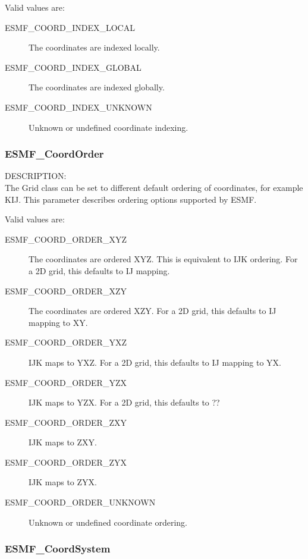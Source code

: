 Valid values are:
\begin{description}
   \item [ESMF\_COORD\_INDEX\_LOCAL]
         The coordinates are indexed locally.  

   \item [ESMF\_COORD\_INDEX\_GLOBAL]
         The coordinates are indexed globally.

   \item [ESMF\_COORD\_INDEX\_UNKNOWN]
         Unknown or undefined coordinate indexing.
\end{description}

\subsubsection{ESMF\_CoordOrder}

{\sf DESCRIPTION:\\}
The Grid class can be set to different default ordering of coordinates, for
example KIJ.  This parameter describes ordering options supported by ESMF.

Valid values are:
\begin{description}
   \item [ESMF\_COORD\_ORDER\_XYZ]
         The coordinates are ordered XYZ.  This is equivalent to IJK ordering.
         For a 2D grid, this defaults to IJ mapping.

   \item [ESMF\_COORD\_ORDER\_XZY]
         The coordinates are ordered XZY.  For a 2D grid, this defaults to IJ 
         mapping to XY.

   \item [ESMF\_COORD\_ORDER\_YXZ]
         IJK maps to YXZ.  For a 2D grid, this defaults to IJ mapping to YX.

   \item [ESMF\_COORD\_ORDER\_YZX]
         IJK maps to YZX.  For a 2D grid, this defaults to ??

   \item [ESMF\_COORD\_ORDER\_ZXY]
         IJK maps to ZXY.

   \item [ESMF\_COORD\_ORDER\_ZYX]
         IJK maps to ZYX.

   \item [ESMF\_COORD\_ORDER\_UNKNOWN]
         Unknown or undefined coordinate ordering.
\end{description}

\subsubsection{ESMF\_CoordSystem}


